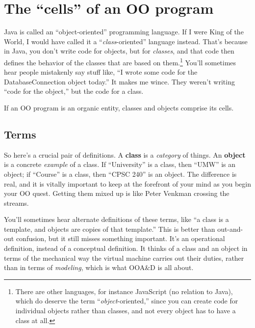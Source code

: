 
\chapter{The ``cells'' of an OO program}
\label{ch:cells}


Java is called an ``object-oriented'' programming language. If I were King of
the World, I would have called it a ``\textit{class}-oriented'' language
instead. That's because in Java, you don't write code for objects, but for
\textit{classes}, and that code then defines the behavior of the classes that
are based on them.\footnote{There are other languages, for instance JavaScript
(no relation to Java), which do deserve the term ``\textit{object}-oriented,''
since you can create code for individual objects rather than classes, and not
every object has to have a class at all.} You'll sometimes hear people
mistakenly say stuff like, ``I wrote some code for the DatabaseConnection
object today.'' It makes me wince. They weren't writing ``code for the
object,'' but the code for a class.

If an OO program is an organic entity, classes and objects comprise its cells.

\section{Terms}

So here's a crucial pair of definitions. A \textbf{class} is a
\textit{category} of things. An \textbf{object} is a concrete \textit{example}
of a class. If ``University'' is a class, then ``UMW'' is an object; if
``Course'' is a class, then ``CPSC 240'' is an object. The difference is real,
and it is vitally important to keep at the forefront of your mind as you begin
your OO quest. Getting them mixed up is like Peter Venkman crossing the
streams.

You'll sometimes hear alternate definitions of these terms, like ``a class is
a template, and objects are copies of that template.'' This is better than
out-and-out confusion, but it still misses something important. It's an
operational definition, instead of a conceptual definition. It thinks of a
class and an object in terms of the mechanical way the virtual machine carries
out their duties, rather than in terms of \textit{modeling}, which is what
OOA\&D is all about.


